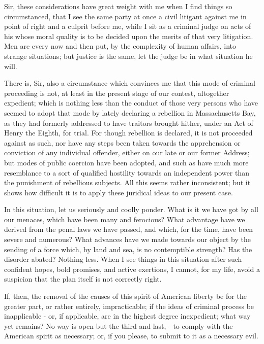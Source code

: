 Sir, these considerations have great weight with me when I find things so circumstanced, that I see the same party at once a civil litigant against me in point of right and a culprit before me, while I sit as a criminal judge on acts of his whose moral quality is to be decided upon the merits of that very litigation. Men are every now and then put, by the complexity of human affairs, into strange situations; but justice is the same, let the judge be in what situation he will.\par

There is, Sir, also a circumstance which convinces me that this mode of criminal proceeding is not, at least in the present stage of our contest, altogether expedient; which is nothing less than the conduct of those very persons who have seemed to adopt that mode by lately declaring a rebellion in Massachusetts Bay, as they had formerly addressed to have traitors brought hither, under an Act of Henry the Eighth, for trial. For though rebellion is declared, it is not proceeded against as such, nor have any steps been taken towards the apprehension or conviction of any individual offender, either on our late or our former Address; but modes of public coercion have been adopted, and such as have much more resemblance to a sort of qualified hostility towards an independent power than the punishment of rebellious subjects. All this seems rather inconsistent; but it shows how difficult it is to apply these juridical ideas to our present case.\par

In this situation, let us seriously and coolly ponder. What is it we have got by all our menaces, which have been many and ferocious? What advantage have we derived from the penal laws we have passed, and which, for the time, have been severe and numerous? What advances have we made towards our object by the sending of a force which, by land and sea, is no contemptible strength? Has the disorder abated? Nothing less. When I see things in this situation after such confident hopes, bold promises, and active exertions, I cannot, for my life, avoid a suspicion that the plan itself is not correctly right.\par

If, then, the removal of the causes of this spirit of American liberty be for the greater part, or rather entirely, impracticable; if the ideas of criminal process be inapplicable - or, if applicable, are in the highest degree inexpedient; what way yet remains? No way is open but the third and last, - to comply with the American spirit as necessary; or, if you please, to submit to it as a necessary evil.\par

